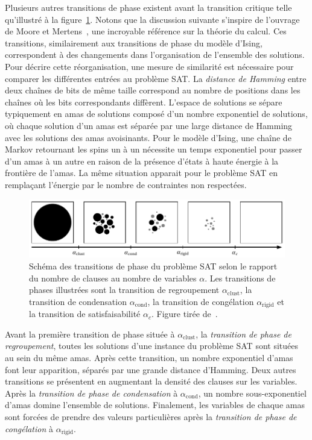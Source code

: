 Plusieurs autres transitions de phase existent avant la transition critique telle qu'illustré à la figure~\ref{fig:transitions-de-phase}. Notons que la discussion suivante s'inspire de l'ouvrage de Moore et Mertens~\cite{mooreNatureComputation2011}, une incroyable référence sur la théorie du calcul. Ces transitions, similairement aux transitions de phase du modèle d'Ising, correspondent à des changements dans l'organisation de l'ensemble des solutions. Pour décrire cette réorganisation, une mesure de similarité est nécessaire pour comparer les différentes entrées au problème SAT. La \textit{distance de Hamming} entre deux chaînes de bits de même taille correspond au nombre de positions dans les chaînes où les bits correspondants diffèrent. L'espace de solutions se sépare typiquement en amas de solutions composé d'un nombre exponentiel de solutions, où chaque solution d'un amas est séparée par une large distance de Hamming avec les solutions des amas avoisinants. Pour le modèle d'Ising, une chaîne de Markov retournant les spins un à un nécessite un temps exponentiel pour passer d'un amas à un autre en raison de la présence d'états à haute énergie à la frontière de l'amas. La même situation apparait pour le problème SAT en remplaçant l'énergie par le nombre de contraintes non respectées.

\begin{figure}[H]
    \centering
    \includegraphics[width=1\textwidth]{figures/phase-transitions.pdf}
    \caption[Transitions de phase du problème SAT]{Schéma des transitions de phase du problème SAT selon le rapport du nombre de clauses au nombre de variables $\alpha$. Les transitions de phases illustrées sont la transition de regroupement $\alpha_{\text{clust}}$, la transition de condensation $\alpha_{\text{cond}}$, la transition de congélation $\alpha_{\text{rigid}}$ et la transition de satisfaisabilité $\alpha_{c}$. Figure tirée de~\cite{mooreNatureComputation2011}.}
    \label{fig:transitions-de-phase}
\end{figure}

Avant la première transition de phase située à $\alpha_{\text{clust}}$, la \textit{transition de phase de regroupement}, toutes les solutions d'une instance du problème SAT sont situées au sein du même amas. Après cette transition, un nombre exponentiel d'amas font leur apparition, séparés par une grande distance d'Hamming. Deux autres transitions se présentent en augmentant la densité des clauses sur les variables. Après la \textit{transition de phase de condensation} à $\alpha_{\text{cond}}$, un nombre sous-exponentiel d'amas domine l'ensemble de solutions. Finalement, les variables de chaque amas sont forcées de prendre des valeurs particulières après la \textit{transition de phase de congélation} à $\alpha_{\text{rigid}}$.

